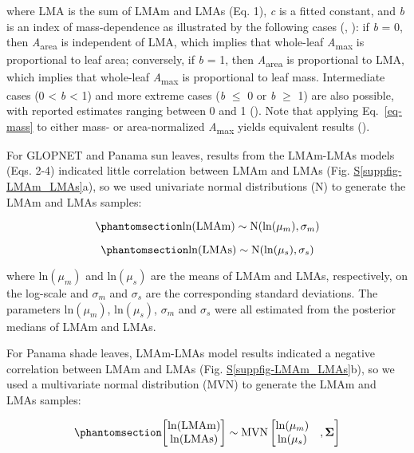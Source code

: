 \documentclass[
  12pt,
  letterpaper,
  DIV=11,
  numbers=noendperiod]{scrartcl}
\numberwithin{equation}{section}
\newcommand*\quartosuppfigref[1]{Fig. \hyperref[#1]{S\ref{#1}}}
\begin{document}
where LMA is the sum of LMAm and LMAs (Eq. 1), \emph{c} is a fitted
constant, and \emph{b} is an index of mass-dependence as illustrated by
the following cases (,
): if \emph{b} = 0, then
\emph{A}\textsubscript{area} is independent of LMA, which implies that
whole-leaf \emph{A}\textsubscript{max} is proportional to leaf area;
conversely, if \emph{b} = 1, then \emph{A}\textsubscript{area} is
proportional to LMA, which implies that whole-leaf
\emph{A}\textsubscript{max} is proportional to leaf mass. Intermediate
cases (0 \textless{} \emph{b} \textless{} 1) and more extreme cases
(\emph{b} \(\le\) 0 or \emph{b} \(\geq\) 1) are also possible, with
reported estimates ranging between 0 and 1
(). Note that applying
Eq.~\ref{eq-mass} to either mass- or area-normalized
\emph{A}\textsubscript{max} yields equivalent results
().

For GLOPNET and Panama sun leaves, results from the LMAm-LMAs models
(Eqs. 2-4) indicated little correlation between LMAm and LMAs
(\quartosuppfigref{suppfig-LMAm_LMAs}a), so we used univariate normal
distributions (N) to generate the LMAm and LMAs samples:

\begin{equation}\phantomsection\label{eq-sim_LMAm}{
\mathrm{ln}(\mathrm{LMAm}) \sim \mathrm{N}(\mathrm{ln}(\mu_m), \sigma_m)
}\end{equation}

\begin{equation}\phantomsection\label{eq-sim_LMAs}{
\mathrm{ln}(\mathrm{LMAs}) \sim \mathrm{N}(\mathrm{ln}(\mu_s), \sigma_s)
}\end{equation}

where \(\mathrm{ln}(\mu_m)\) and \(\mathrm{ln}(\mu_s)\) are the means of
LMAm and LMAs, respectively, on the log-scale and \(\sigma_m\) and
\(\sigma_s\) are the corresponding standard deviations. The parameters
\(\mathrm{ln}(\mu_m)\), \(\mathrm{ln}(\mu_s)\), \(\sigma_m\) and
\(\sigma_s\) were all estimated from the posterior medians of LMAm and
LMAs.

For Panama shade leaves, LMAm-LMAs model results indicated a negative
correlation between LMAm and LMAs
(\quartosuppfigref{suppfig-LMAm_LMAs}b), so we used a multivariate
normal distribution (MVN) to generate the LMAm and LMAs samples:

\begin{equation}\phantomsection\label{eq-sim_LMAm_LMAs}{
\begin{bmatrix}
\mathrm{ln}(\mathrm{LMAm})\\
\mathrm{ln}(\mathrm{LMAs})
\end{bmatrix}
\sim \mathrm{MVN}
\left[
\begin{matrix}
\ln(\mu_{m}) &\\
\ln(\mu_{s}) &
\end{matrix},
\boldsymbol{\Sigma}
\right]
}\end{equation}
\end{document}
